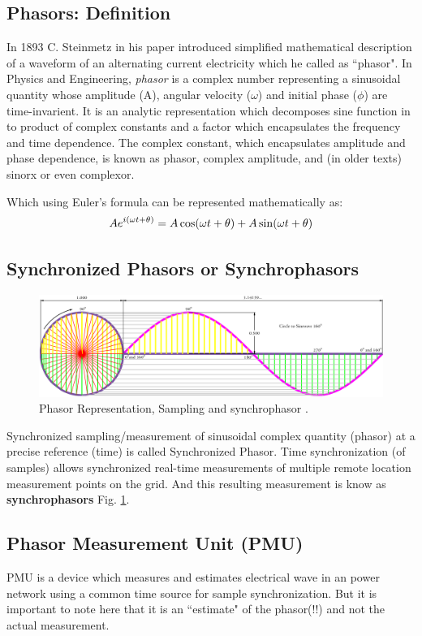 \subsection{Phasors: Definition}

In 1893 C. Steinmetz in his paper introduced simplified mathematical description of a waveform of an alternating current electricity which he called as ``phasor". In Physics and Engineering, \textit{phasor} is a complex number representing a sinusoidal quantity whose amplitude (A), angular velocity ($\omega$) and initial phase ($\phi$) are time-invarient. It is an analytic representation which decomposes sine function in to product of complex constants and a factor which encapsulates the frequency and time dependence. The complex constant, which encapsulates amplitude and phase dependence, is known as phasor, complex amplitude, and (in older texts) sinorx or even complexor.

Which using Euler's formula can be represented mathematically as:
\begin{equation}\boldmath
Ae^{i(\omega t + \theta)} = A\cos(\omega t + \theta) + A\sin(\omega t + \theta)
\end{equation}

\subsection{Synchronized Phasors or Synchrophasors}
\begin{figure}
	\includegraphics[width=\textwidth]{fig/Circle-To-Sine-Wave.png}
	\caption{Phasor Representation, Sampling and synchrophasor \cite{CirSinWave} .} 
	\label{fig:CirSin}
\end{figure}
 Synchronized sampling/measurement of sinusoidal complex quantity (phasor) at a precise reference (time) is called Synchronized Phasor. Time synchronization (of samples) allows synchronized real-time measurements of multiple remote location measurement points on the grid. And this resulting measurement is know as \textbf{synchrophasors} Fig. \ref{fig:CirSin}.
\subsection{Phasor Measurement Unit (PMU)}
PMU is a device which measures and estimates electrical wave in an power network using a common time source for sample synchronization. But it is important to note here that it is an ``estimate" of the phasor(!!) and not the actual measurement. 

